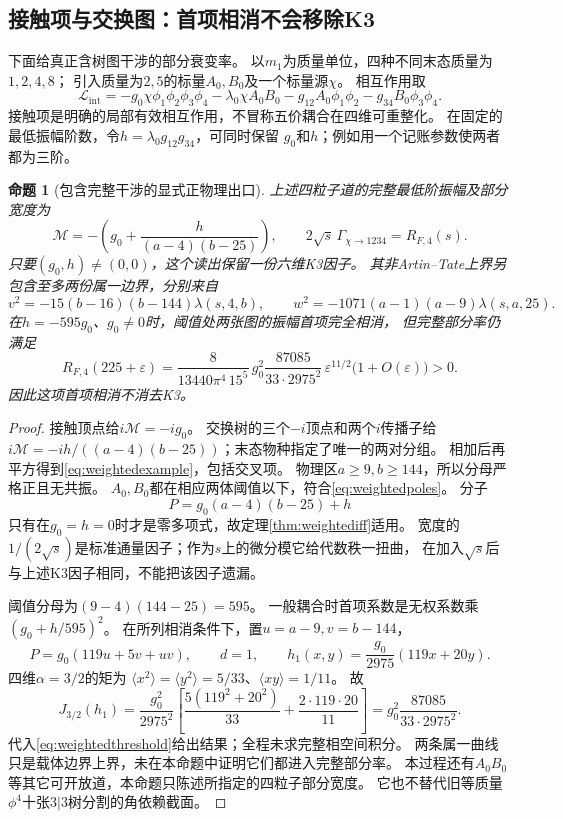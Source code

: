 \documentclass[11pt,a4paper]{ctexart}
\theoremstyle{cnplain}\newtheorem{theorem}{定理}[section]
\newtheorem{proposition}[theorem]{命题}
\theoremstyle{definition}\newtheorem{definition}[theorem]{定义}
\theoremstyle{remark}\newtheorem{remark}[theorem]{注}
\begin{document}
\subsection{接触项与交换图：首项相消不会移除K3}
下面给真正含树图干涉的部分衰变率。
以$m_1$为质量单位，四种不同末态质量为$1,2,4,8$；
引入质量为$2,5$的标量$A_0,B_0$及一个标量源$\chi$。
相互作用取
\[
 \mathcal L_{\mathrm{int}}
 =-g_0\chi\phi_1\phi_2\phi_3\phi_4
  -\lambda_0\chi A_0B_0-g_{12}A_0\phi_1\phi_2-g_{34}B_0\phi_3\phi_4.
\]
接触项是明确的局部有效相互作用，不冒称五价耦合在四维可重整化。
在固定的最低振幅阶数，令$h=\lambda_0g_{12}g_{34}$，可同时保留
$g_0$和$h$；例如用一个记账参数使两者都为三阶。

\begin{proposition}[包含完整干涉的显式正物理出口]\label{prop:weightedinterference}
上述四粒子道的完整最低阶振幅及部分宽度为
\begin{equation}\label{eq:weightedexample}
 \mathcal M=-\left(g_0+\frac{h}{(a-4)(b-25)}\right),\qquad
 2\sqrt{s}\,\Gamma_{\chi\to1234}=R_{F,4}(s).
\end{equation}
只要$(g_0,h)\ne(0,0)$，这个读出保留一份六维K3因子。
其非Artin--Tate上界另包含至多两份属一边界，分别来自
\[
 v^2=-15(b-16)(b-144)\lambda(s,4,b),\qquad
 w^2=-1071(a-1)(a-9)\lambda(s,a,25).
\]
在$h=-595g_0$、$g_0\ne0$时，阈值处两张图的振幅首项完全相消，
但完整部分率仍满足
\begin{equation}\label{eq:weightedcancellation}
 R_{F,4}(225+\varepsilon)
 =\frac{8}{13440\pi^4\,15^5}\,
   g_0^2\frac{87085}{33\cdot2975^2}\,
   \varepsilon^{11/2}\bigl(1+O(\varepsilon)\bigr)>0.
\end{equation}
因此这项首项相消不消去K3。
\end{proposition}
\begin{proof}
接触顶点给$i\mathcal M=-ig_0$。
交换树的三个$-i$顶点和两个$i$传播子给
$i\mathcal M=-ih/((a-4)(b-25))$；末态物种指定了唯一的两对分组。
相加后再平方得到\eqref{eq:weightedexample}，包括交叉项。
物理区$a\ge9,b\ge144$，所以分母严格正且无共振。
$A_0,B_0$都在相应两体阈值以下，符合\eqref{eq:weightedpoles}。
分子
\[
 P=g_0(a-4)(b-25)+h
\]
只有在$g_0=h=0$时才是零多项式，故定理\ref{thm:weightediff}适用。
宽度的$1/(2\sqrt s)$是标准通量因子；作为$s$上的微分模它给代数秩一扭曲，
在加入$\sqrt s$后与上述K3因子相同，不能把该因子遗漏。

阈值分母为$(9-4)(144-25)=595$。
一般耦合时首项系数是无权系数乘$(g_0+h/595)^2$。
在所列相消条件下，置$u=a-9,v=b-144$，
\[
 P=g_0(119u+5v+uv),\qquad d=1,\qquad
 h_1(x,y)=\frac{g_0}{2975}(119x+20y).
\]
四维$\alpha=3/2$的矩为
$\langle x^2\rangle=\langle y^2\rangle=5/33$、$\langle xy\rangle=1/11$。
故
\[
 J_{3/2}(h_1)=\frac{g_0^2}{2975^2}
       \left[\frac{5(119^2+20^2)}{33}+\frac{2\cdot119\cdot20}{11}\right]
       =g_0^2\frac{87085}{33\cdot2975^2}.
\]
代入\eqref{eq:weightedthreshold}给出结果；全程未求完整相空间积分。
两条属一曲线只是载体边界上界，未在本命题中证明它们都进入完整部分率。
本过程还有$A_0B_0$等其它可开放道，本命题只陈述所指定的四粒子部分宽度。
它也不替代旧等质量$\phi^4$十张$3|3$树分割的角依赖截面。
\end{proof}
\end{document}
